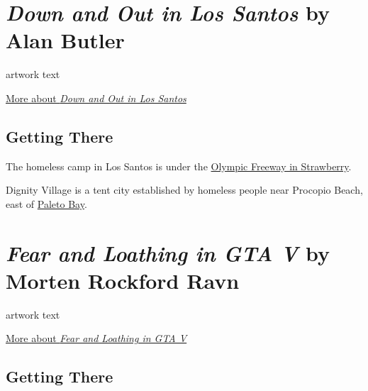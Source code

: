 \documentclass[
  openany]{book}
\begin{document}
\hypertarget{down-and-out-in-los-santos-by-alan-butler}{%
\section*{\texorpdfstring{\emph{Down and Out in Los Santos} by Alan Butler}{Down and Out in Los Santos by Alan Butler}}\label{down-and-out-in-los-santos-by-alan-butler}}

artwork text

\href{http://www.alanbutler.info/down-and-out-in-los-santos-2016}{More about \emph{Down and Out in Los Santos}}

\hypertarget{getting-there-1}{%
\subsection*{Getting There}\label{getting-there-1}}

The homeless camp in Los Santos is under the \href{https://grandtheftdata.com/landmarks/\#252.086,-1208.975,5,hybrid,name,Strawberry_Subway_Station,_Downtown}{Olympic Freeway in Strawberry}.

Dignity Village is a tent city established by homeless people near Procopio Beach, east of \href{https://grandtheftdata.com/landmarks/\#-171.667,6208.676,5,hybrid,name=paleto_bay,Belinda_May's_Beauty_Salon,_Paleto_Blvd,_Paleto_Bay}{Paleto Bay}.

\hypertarget{fear-and-loathing-in-gta-v-by-morten-rockford-ravn}{%
\section*{\texorpdfstring{\emph{Fear and Loathing in GTA V} by Morten Rockford Ravn}{Fear and Loathing in GTA V by Morten Rockford Ravn}}\label{fear-and-loathing-in-gta-v-by-morten-rockford-ravn}}

artwork text

\href{https://fearandloathingingtav.tumblr.com/}{More about \emph{Fear and Loathing in GTA V}}

\hypertarget{getting-there-2}{%
\subsection*{Getting There}\label{getting-there-2}}
\end{document}
